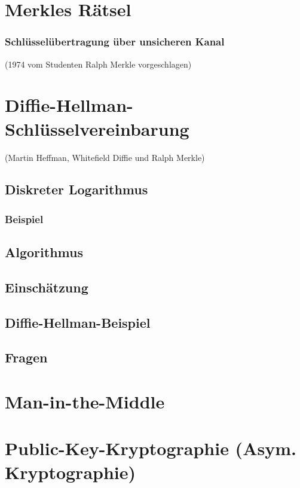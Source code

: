 \section{Merkles Rätsel}
\subsubsection*{Schlüsselübertragung über unsicheren Kanal}
(1974 vom Studenten Ralph Merkle vorgeschlagen)

\section{Diffie-Hellman-Schlüsselvereinbarung}
(Martin Heffman, Whitefield Diffie und Ralph Merkle)
\subsection{Diskreter Logarithmus}
\subsubsection*{Beispiel}
\subsection{Algorithmus}
\subsection{Einschätzung}
\subsection{Diffie-Hellman-Beispiel}
\subsection{Fragen}
\section{Man-in-the-Middle}
\section{Public-Key-Kryptographie (Asym. Kryptographie)}

